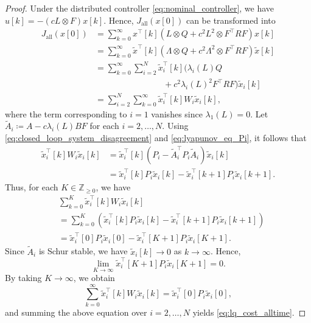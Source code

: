 \documentclass[letterpaper,10pt,conference]{ieeeconf}
\begin{document}
\begin{proof}
  Under the distributed controller \eqref{eq:nominal_controller}, we have $u[k] = -(cL \otimes F)x[k]$.
  Hence, $J_{\mathrm{all}}(x[0])$ can be transformed into
  \begin{align}
    J_{\mathrm{all}}(x[0])
    &= \sum_{k=0}^\infty
      x^\top[k]
      \left(
        L \otimes Q + c^2 L^2 \otimes F^\top R F
      \right) x[k] \\
    &= \sum_{k=0}^\infty
      \tilde{x}^\top[k]
      \left(
        \Lambda \otimes Q + c^2 \Lambda^2 \otimes F^\top R F
      \right) \tilde{x}[k] \\
    &= \sum_{k=0}^\infty \sum_{i=2}^N
      \tilde{x}_i^\top[k] \bigl( \lambda_i(L) Q \\
      &\hspace{8em} + c^2 \lambda_i(L)^2 F^\top R F \bigr) \tilde{x}_i[k] \\
    &= \sum_{i=2}^N \sum_{k=0}^\infty \tilde{x}_i^\top[k] W_i \tilde{x}_i[k],
  \end{align}
  where the term corresponding to $i=1$ vanishes since $\lambda_1(L)=0$.
  Let $\tilde{A}_i \coloneqq A - c\lambda_i(L)BF$ for each $i=2,\dots,N$.
  Using \eqref{eq:closed_loop_system_disagreement} and \eqref{eq:lyapunov_eq_Pi}, it follows that
  \begin{align}
    \tilde{x}_i^\top[k] W_i \tilde{x}_i[k]
    &= \tilde{x}_i^\top[k]
      \left(
        P_i - \tilde{A}_i^\top P_i \tilde{A}_i
      \right) \tilde{x}_i[k] \\
    &= \tilde{x}_i^\top[k] P_i \tilde{x}_i[k] - \tilde{x}_i^\top[k+1] P_i \tilde{x}_i[k+1].
  \end{align}
  Thus, for each $K \in \mathbb{Z}_{\geq 0}$, we have
  \begin{align}
    &\sum_{k=0}^K \tilde{x}_i^\top[k] W_i \tilde{x}_i[k] \\
    &= \sum_{k=0}^K
      \left(
        \tilde{x}_i^\top[k] P_i \tilde{x}_i[k]
        - \tilde{x}_i^\top[k+1] P_i \tilde{x}_i[k+1]
      \right) \\
    &= \tilde{x}_i^\top[0] P_i \tilde{x}_i[0]
      - \tilde{x}_i^\top[K+1] P_i \tilde{x}_i[K+1].
  \end{align}
  Since $\tilde{A}_i$ is Schur stable, we have $\tilde{x}_i[k] \to 0$ as $k \to \infty$. Hence,
  \begin{equation}
    \lim_{K \to \infty} \tilde{x}_i^\top[K+1] P_i \tilde{x}_i[K+1] = 0.
  \end{equation}
  By taking $K \to \infty$, we obtain
  \begin{equation}
    \sum_{k=0}^\infty \tilde{x}_i^\top[k] W_i \tilde{x}_i[k]
    = \tilde{x}_i^\top[0] P_i \tilde{x}_i[0],
  \end{equation}
  and summing the above equation over $i=2,\dots,N$ yields \eqref{eq:lq_cost_alltime}.
\end{proof}
\end{document}
